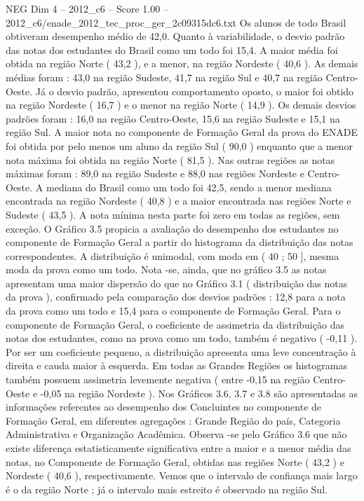 \begin{textsample}{NEG Dim 4 – 2012\_c6 – Score 1.00 – 2012\_c6/enade\_2012\_tec\_proc\_ger\_2c09315dc6.txt}
Os alunos de todo Brasil obtiveram desempenho médio de 42,0.
Quanto à variabilidade, o desvio padrão das notas dos estudantes do Brasil como um todo foi 15,4.
A maior média foi obtida na região Norte ( 43,2 ), e a menor, na região Nordeste ( 40,6 ).
As demais médias foram : 43,0 na região Sudeste, 41,7 na região Sul e 40,7 na região Centro-Oeste.
Já o desvio padrão, apresentou comportamento oposto, o maior foi obtido na região Nordeste ( 16,7 ) e o menor na região Norte ( 14,9 ).
Os demais desvios padrões foram : 16,0 na região Centro-Oeste, 15,6 na região Sudeste e 15,1 na região Sul.
A maior nota no componente de Formação Geral da prova do ENADE foi obtida por pelo menos um aluno da região Sul ( 90,0 ) enquanto que a menor nota máxima foi obtida na região Norte ( 81,5 ).
Nas outras regiões as notas máximas foram : 89,0 na região Sudeste e 88,0 nas regiões Nordeste e Centro-Oeste.
A mediana do Brasil como um todo foi 42,5, sendo a menor mediana encontrada na região Nordeste ( 40,8 ) e a maior encontrada nas regiões Norte e Sudeste ( 43,5 ).
A nota mínima nesta parte foi zero em todas as regiões, sem exceção.
O Gráfico 3.5 propicia a avaliação do desempenho dos estudantes no componente de Formação Geral a partir do histograma da distribuição das notas correspondentes.
A distribuição é unimodal, com moda em ( 40 ; 50 ], mesma moda da prova como um todo.
Nota -se, ainda, que no gráfico 3.5 as notas apresentam uma maior dispersão do que no Gráfico 3.1 ( distribuição das notas da prova ), confirmado pela comparação dos desvios padrões : 12,8 para a nota da prova como um todo e 15,4 para o componente de Formação Geral.
Para o componente de Formação Geral, o coeficiente de assimetria da distribuição das notas dos estudantes, como na prova como um todo, também é negativo ( -0,11 ).
Por ser um coeficiente pequeno, a distribuição apresenta uma leve concentração à direita e cauda maior à esquerda.
Em todas as Grandes Regiões os histogramas também possuem assimetria levemente negativa ( entre -0,15 na região Centro-Oeste e -0,05 na região Nordeste ).
Nos Gráficos 3.6, 3.7 e 3.8 são apresentadas as informações referentes ao desempenho dos Concluintes no componente de Formação Geral, em diferentes agregações : Grande Região do país, Categoria Administrativa e Organização Acadêmica.
Observa -se pelo Gráfico 3.6 que não existe diferença estatisticamente significativa entre a maior e a menor média das notas, no Componente de Formação Geral, obtidas nas regiões Norte ( 43,2 ) e Nordeste ( 40,6 ), respectivamente.
Vemos que o intervalo de confiança mais largo é o da região Norte ; já o intervalo mais estreito é observado na região Sul.

\end{textsample}
